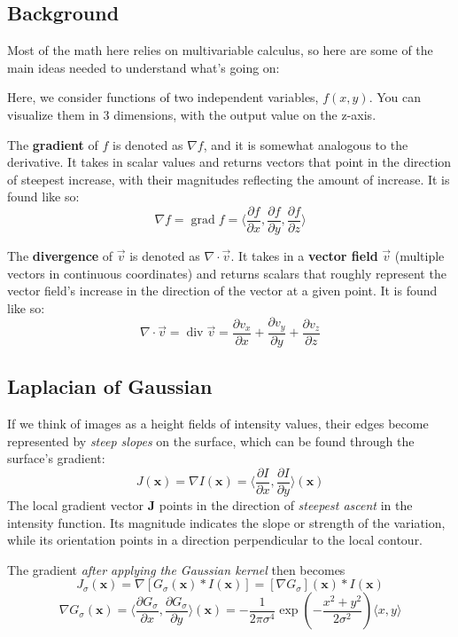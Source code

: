 \documentclass{article}
\begin{document}
\subsection{Background}
Most of the math here relies on multivariable calculus, so here are some of the main ideas needed to understand what's going on:

Here, we consider functions of two independent variables, $f(x, y)$. You can visualize them in 3 dimensions, with the output value on the z-axis.

The \textbf{gradient} of $f$ is denoted as $\nabla f$, and it is somewhat analogous to the derivative. It takes in scalar values and returns vectors that point in the direction of steepest increase, with their magnitudes reflecting the amount of increase. It is found like so:
\[\nabla f = \operatorname { grad } f = \langle \frac { \partial f } { \partial x }, \frac { \partial f } { \partial y }, \frac { \partial f } { \partial z } \rangle \]

The \textbf{divergence} of $\vec v$ is denoted as $\nabla \cdot \vec v$. It takes in a \textbf{vector field} $\vec v$ (multiple vectors in continuous coordinates) and returns scalars that roughly represent the vector field's increase in the direction of the vector at a given point. It is found like so:
\[\nabla \cdot \vec { v } = \operatorname { div } \vec { v } = \frac { \partial v _ { x } } { \partial x } + \frac { \partial v _ { y } } { \partial y } + \frac { \partial v _ { z } } { \partial z }\]

\subsection{Laplacian of Gaussian}
If we think of images as a height fields of intensity values, their edges become represented by \textit{steep slopes} on the surface, which can be found through the surface's gradient:
\[J( \boldsymbol { x } ) = \nabla I( \boldsymbol { x } ) = \langle\frac{\partial I}{\partial x}, \frac{\partial I}{\partial y}\rangle( \boldsymbol { x } )\]
The local gradient vector \textbf{J} points in the direction of \textit{steepest ascent} in the intensity function. Its magnitude indicates the slope or strength of the variation, while its orientation
points in a direction perpendicular to the local contour.

The gradient \textit{after applying the Gaussian kernel} then becomes
\[J _ { \sigma }( \boldsymbol { x } ) = \nabla \left[ G _ { \sigma }( \boldsymbol { x } ) * I ( \boldsymbol { x } )\right] = \left[ \nabla G _ { \sigma } \right]( \boldsymbol { x } ) * I( \boldsymbol { x } )\]
\[\nabla G _ { \sigma }( \boldsymbol { x } ) = \langle \frac { \partial G _ { \sigma } } { \partial x } , \frac { \partial G _ { \sigma } } { \partial y } \rangle( \boldsymbol { x } ) = -\frac { 1 } { 2 \pi \sigma ^ { 4 } } \exp \left( - \frac { x ^ { 2 } + y ^ { 2 } } { 2 \sigma ^ { 2 } } \right)\langle x, y \rangle\]
\end{document}
